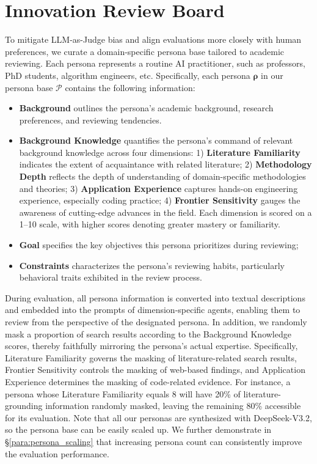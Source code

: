 \section{Innovation Review Board}
\label{app:personas}
To mitigate LLM-as-Judge bias and align evaluations more closely with human preferences, we curate a domain-specific persona base tailored to academic reviewing.
Each persona represents a routine AI practitioner, such as professors, PhD students, algorithm engineers, etc.
Specifically, each persona $\boldsymbol{\rho}$ in our persona base $\boldsymbol{\mathcal{P}}$ contains the following information:
\begin{itemize}[topsep=0pt,partopsep=0pt,parsep=0pt,itemsep=0pt,leftmargin=*,labelsep=0.5em]
    \item \textbf{Background} outlines the persona’s academic background, research preferences, and reviewing tendencies.
    \item \textbf{Background Knowledge} quantifies the persona’s command of relevant background knowledge across four dimensions: 1) \textbf{Literature Familiarity} indicates the extent of acquaintance with related literature; 2) \textbf{Methodology Depth} reflects the depth of understanding of domain-specific methodologies and theories; 3) \textbf{Application Experience} captures hands-on engineering experience, especially coding practice; 4) \textbf{Frontier Sensitivity} gauges the awareness of cutting-edge advances in the field. Each dimension is scored on a 1–10 scale, with higher scores denoting greater mastery or familiarity.
    \item \textbf{Goal} specifies the key objectives this persona prioritizes during reviewing;
    \item \textbf{Constraints} characterizes the persona’s reviewing habits, particularly behavioral traits exhibited in the review process.
\end{itemize}
During evaluation, all persona information is converted into textual descriptions and embedded into the prompts of dimension-specific agents, enabling them to review from the perspective of the designated persona.
In addition, we randomly mask a proportion of search results according to the Background Knowledge scores, thereby faithfully mirroring the persona's actual expertise.
Specifically, Literature Familiarity governs the masking of literature-related search results, Frontier Sensitivity controls the masking of web-based findings, and Application Experience determines the masking of code-related evidence.
For instance, a persona whose Literature Familiarity equals 8 will have 20\% of literature-grounding information randomly masked, leaving the remaining 80\% accessible for its evaluation.
Note that all our personas are synthesized with DeepSeek-V3.2, so the persona base can be easily scaled up.
We further demonstrate in \S\ref{para:persona_scaling} that increasing persona count can consistently improve the evaluation performance.

